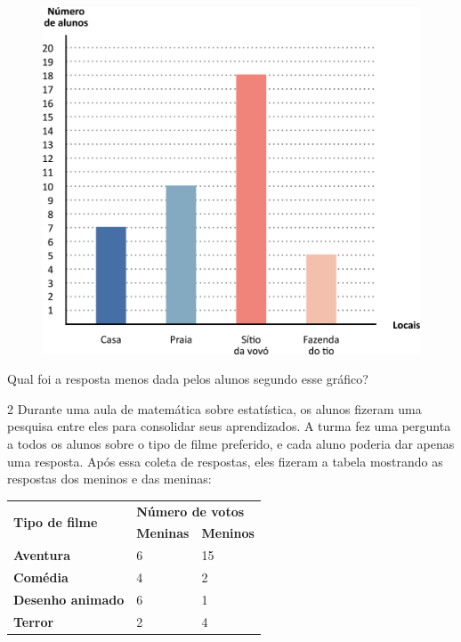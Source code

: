 \begin{figure}[htpb!]
\centering
\includegraphics[width=\textwidth]{./media/image79.png}
\end{figure}

Qual foi a resposta menos dada pelos alunos segundo esse gráfico?

\num{2} Durante uma aula de matemática sobre estatística, os alunos fizeram uma
pesquisa entre eles para consolidar seus aprendizados. A turma fez uma
pergunta a todos os alunos sobre o tipo de filme preferido, e cada aluno
poderia dar apenas uma resposta. Após essa coleta de respostas, eles
fizeram a tabela mostrando as respostas dos meninos e das
meninas:

\begin{center}
\begin{tabular}{l|ll}
\hline
\multirow{2}{*}{\textbf{Tipo de filme}} & \multicolumn{2}{l}{\textbf{Número de votos}} \\ \cline{2-3} 
 & \multicolumn{1}{l|}{\textbf{Meninas}} & \textbf{Meninos} \\ \hline
\textbf{Aventura} & \multicolumn{1}{l|}{6} & 15 \\ \hline
\textbf{Comédia} & \multicolumn{1}{l|}{4} & 2 \\ \hline
\textbf{Desenho animado} & \multicolumn{1}{l|}{6} & 1 \\ \hline
\textbf{Terror} & \multicolumn{1}{l|}{2} & 4 \\ \hline
\end{tabular}
\end{center}

